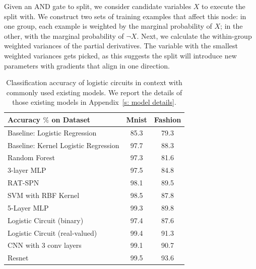 \documentclass[letterpaper]{article} %
\begin{document}
Given an AND gate to split, we consider candidate variables $X$ to execute the split with. We construct two sets of training examples that affect this node: in one group, each example is weighted by the marginal probability of $X$; in the other, 
with the marginal probability of $\neg X$.  
Next, we calculate the within-group weighted variances of the partial derivatives.
The variable with the smallest weighted variances gets picked, as this suggests the split will introduce new parameters with gradients that align in one direction.
   
\begin{table}[t]
 \centering
 \begin{minipage}{0.48\textwidth}
          \caption{Classification accuracy of logistic circuits in context with commonly used existing models. We report the details of those existing models in Appendix~\ref{s: model details}.} 
          \label{table: accuracy}
          \centering
          {\fontsize{8.5}{9}\selectfont
          \begin{sc}
          \begin{tabular}{ @{}l c c @{} }
          \toprule
       	Accuracy $\%$ on Dataset & Mnist & Fashion \\
          \midrule\midrule
           Baseline: Logistic Regression & 85.3 & 79.3 \\
           Baseline: Kernel Logistic Regression & 97.7 & 88.3 \\
           Random Forest & 97.3 & 81.6 \\
            3-layer MLP\label{3MLP}
 & 97.5 & 84.8\\
 	RAT-SPN \cite{rat-spn2018} &98.1 & 89.5\\
	SVM with RBF Kernel & 98.5 & 87.8 \\
	            5-Layer MLP  & 99.3 & 89.8 \\
            \midrule 
          Logistic Circuit (binary) &  97.4 & 87.6 \\
          Logistic Circuit (real-valued) & 99.4 & 91.3\\ 
          \midrule
            CNN with 3 conv layers & 99.1  &90.7\\
            Resnet \cite{he2016cvpr}& 99.5 & 93.6 \\
		\bottomrule
		\end{tabular}
          \end{sc}
     }
     \end{minipage}     
   \end{table}
   
\end{document}
